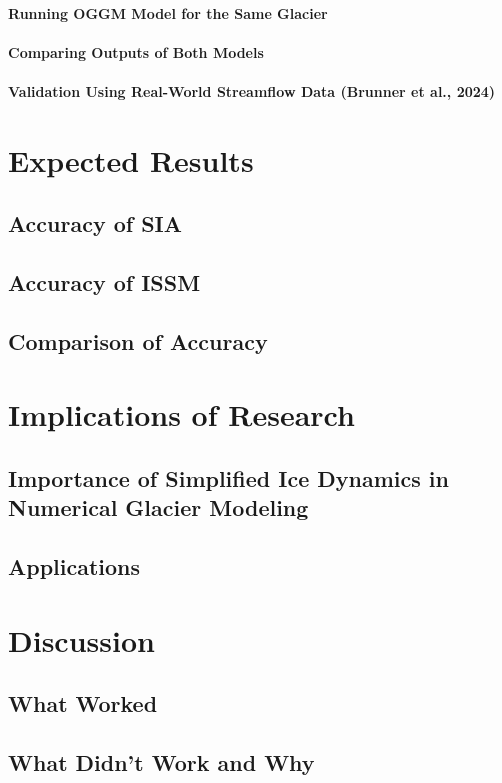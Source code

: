 \documentclass{article}
\begin{document}
\paragraph{Running OGGM Model for the Same Glacier}
\paragraph{Comparing Outputs of Both Models}
\paragraph{Validation Using Real-World Streamflow Data (Brunner et al., 2024)}

\section{Expected Results}
\subsection{Accuracy of SIA}
\subsection{Accuracy of ISSM}
\subsection{Comparison of Accuracy}

\section{Implications of Research}
\subsection{Importance of Simplified Ice Dynamics in Numerical Glacier Modeling}
\subsection{Applications}

\section{Discussion}
\subsection{What Worked}
\subsection{What Didn’t Work and Why}
\end{document}
